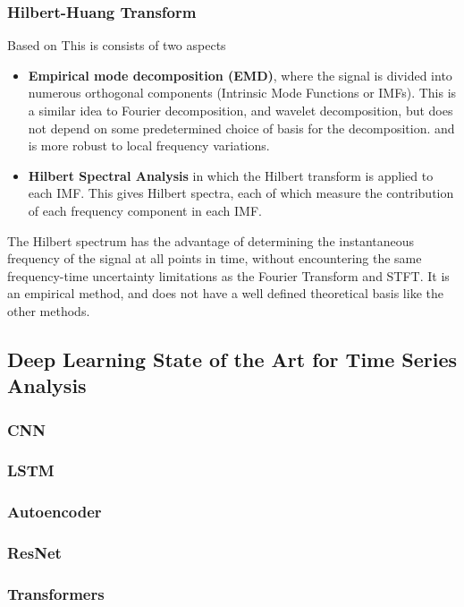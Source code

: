 \documentclass[9pt,conference]{IEEEtran}
\begin{document}
\subsubsection{Hilbert-Huang Transform}
Based on \cite{de2022survey} \cite{huang2005t} This is consists of two aspects
\begin{itemize}
    \item \textbf{Empirical mode decomposition (EMD)}, where the signal is divided into numerous orthogonal components (Intrinsic Mode Functions or IMFs). This is a similar idea to Fourier decomposition, and wavelet decomposition, but does not depend on some predetermined choice of basis for the decomposition. and is more robust to local frequency variations.
    \item \textbf{Hilbert Spectral Analysis} in which the Hilbert transform is applied to each IMF. This gives Hilbert spectra, each of which measure the contribution of each frequency component in each IMF.
\end{itemize}

The Hilbert spectrum has the advantage of determining the instantaneous frequency of the signal at all points in time, without encountering the same frequency-time uncertainty limitations as the Fourier Transform and STFT. It is an empirical method, and does not have a well defined theoretical basis like the other methods.


\subsection{Deep Learning State of the Art for Time Series Analysis}
\subsubsection{CNN}
\subsubsection{LSTM}
\subsubsection{Autoencoder}
\subsubsection{ResNet}
\subsubsection{Transformers}
\end{document}
